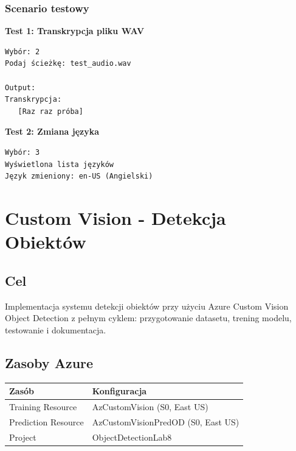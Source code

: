\documentclass[twoside]{article}
\begin{document}
\subsubsection{Scenario testowy}

\textbf{Test 1: Transkrypcja pliku WAV}

\begin{verbatim}
Wybór: 2
Podaj ścieżkę: test_audio.wav

Output:
Transkrypcja:
   [Raz raz próba]
\end{verbatim}

\textbf{Test 2: Zmiana języka}

\begin{verbatim}
Wybór: 3
Wyświetlona lista języków
Język zmieniony: en-US (Angielski)
\end{verbatim}







\newpage

\section{Custom Vision - Detekcja Obiektów}

\subsection{Cel}

Implementacja systemu detekcji obiektów przy użyciu Azure Custom Vision Object Detection z pełnym cyklem: przygotowanie datasetu, trening modelu, testowanie i dokumentacja.

\subsection{Zasoby Azure}

\begin{center}
	\begin{tabular}{|l|l|}
		\hline
		\textbf{Zasób} & \textbf{Konfiguracja} \\
		\hline
		Training Resource & AzCustomVision (S0, East US) \\
		Prediction Resource & AzCustomVisionPredOD (S0, East US) \\
		Project & ObjectDetectionLab8 \\
		\hline
	\end{tabular}
\end{center}
\end{document}
